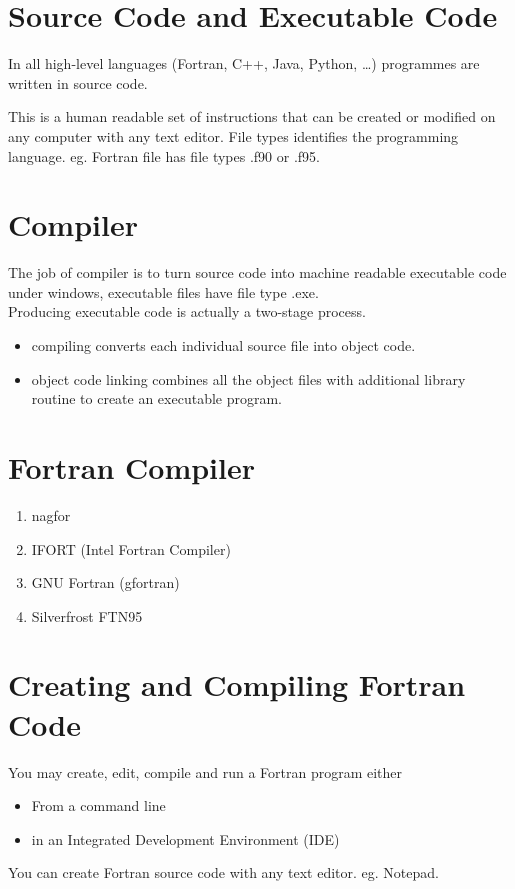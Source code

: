 \documentclass[12pt,oneside]{book}
\begin{document}
    \section{Source Code and Executable Code}
    In all high-level languages (Fortran, C++, Java, Python, \dots ) programmes are written in source code.

    This is a human readable set of instructions that can be created or modified on any computer with any text editor. File types identifies the programming language. eg. Fortran file has file types .f90 or .f95.
    \section{Compiler}
    The job of compiler is to turn source code into machine readable executable code under windows, executable files have file type .exe.\\

    Producing executable code is actually a two-stage process.
    \begin{itemize}
        \item compiling converts each individual source file into object code.
        \item object code linking combines all the object files with additional library routine to create an executable program.
    \end{itemize}
    \section{Fortran Compiler}
    \begin{enumerate}
        \item nagfor
        \item IFORT (Intel Fortran Compiler)
        \item GNU Fortran (gfortran)
        \item Silverfrost FTN95
    \end{enumerate}
    \section{Creating and Compiling Fortran Code}
    You may create, edit, compile and run a Fortran program either 
    \begin{itemize}
        \item From a command line
        \item in an Integrated Development Environment (IDE)
    \end{itemize}
    You can create Fortran source code with any text editor. eg. Notepad.
\end{document}
